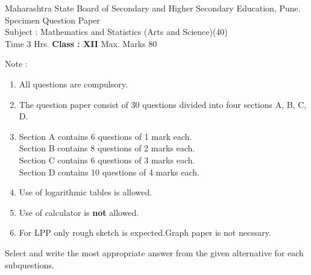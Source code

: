 \documentclass[12pt,a4paper]{article}
\begin{document}
\begin{center}
Maharashtra State Board of Secondary and Higher Secondary Education, Pune. \\
Specimen Question Paper  \doublespacing \\
Subject : Mathematics and Statistics (Arts and Science)(40)\\
Time 3 Hrs.\hspace {4cm} \textbf{Class : XII} \hspace {4cm}Max. Marks 80
\end{center}

Note : 
\begin{enumerate}
\item All questions are compulsory.
\item The question paper consist of 30 questions divided into four sections A, B, C, D.
\item 
Section A contains 6 questions of 1 mark each.  \doublespacing\\
Section B contains 8 questions of 2 marks each.\\
Section C contains 6 questions of 3 marks each.\\
Section D contains 10 questions of 4 marks each.
\item Use of logarithmic tables is allowed. 
\item Use of calculator is \textbf{not} allowed.
\item For LPP only rough sketch is expected.Graph paper is not necssary.
\end{enumerate}
Select and write the most appropriate answer from the given alternative for each subquestions. 
\end{document}
